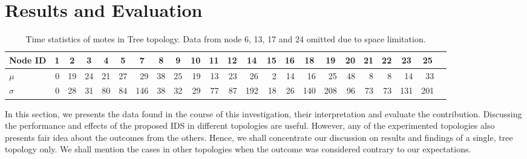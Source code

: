 \documentclass[conference,final]{IEEEtran}
\newcommand*{\bd}[1]{\multicolumn{1}{|c|}{\bfseries #1}}
\begin{document}





\section{Results and Evaluation}
\label{sec:eval}

\begin{table}[t!]
\centering
\begin{tabular}{|l|*{21}{r|}r|}
\hline
\bd{Node ID}           & \bd{1} & \bd{2} & \bd{3} & \bd{4} & \bd{5} & \bd{7} & \bd{8} & \bd{9} & \bd{10} & \bd{11} & \bd{12} & \bd{14} & \bd{15} & \bd{16} & \bd{18} & \bd{19} & \bd{20} & \bd{21} & \bd{22} & \bd{23} & \bd{25}\\
\hline
$\mu$            & 0 & 19 & 24 & 21 & 27 & 29 & 38 & 25 & 19 & 13 & 23 & 26 & 2 & 14 & 16 & 25 & 48 & 8 & 8 & 14 & 33\\
$\sigma$		 & 0 & 28 & 31 & 80 & 84 & 146 & 38 & 32 & 29 & 77 & 87 & 192 & 18 & 26 & 140 & 208 & 96 & 73 & 73 & 131 & 201\\
\hline
\end{tabular}
\caption{Time statistics of motes in Tree topology. Data from node 6, 13, 17 and 24 omitted due to space limitation.}
\label{tab:stat_ellip}
\end{table}

In this section, we presents the data found in the course of this investigation, their interpretation and evaluate the contribution.
Discussing the performance and effects of the proposed IDS in different topologies are useful.
However, any of the experimented topologies also presents fair idea about the outcomes from the others. 
Hence, we shall concentrate our discussion on results and findings of a single, tree topology only.
We shall mention the cases in other topologies when the outcome was considered contrary to our expectations.
\end{document}
